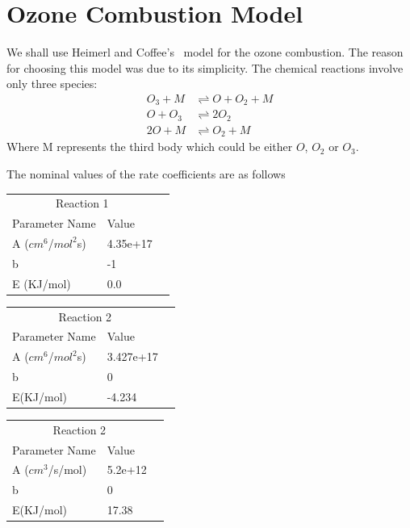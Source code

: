  \section{Ozone Combustion Model} \label{sec:ozone-data}
We shall use Heimerl and Coffee's~\cite{Heimerl} model for the ozone combustion. The reason for choosing this model was due to its
simplicity. The chemical reactions involve only three species:
%
\begin{equation}\label{eq:ozone-mech}
\begin{aligned}
  O_3 + M &\rightleftharpoons O + O_2 + M\\
  O + O_3 &\rightleftharpoons 2O_2\\
  2O + M &\rightleftharpoons O_2 + M
\end{aligned}
\end{equation}
%
Where M represents the third body which could be either $O$,
$O_2$ or $O_3$.

The nominal values of the rate coefficients are as follows

\begin{tabular}{llr}  
    \toprule
    \multicolumn{2}{c}{Reaction 1} \\
    \cmidrule(r){1-2}
    Parameter Name  & Value \\
    \midrule
    A ($cm^6$/$mol^2$s)    & 4.35e+17         \\
    b      & -1       \\
    E (KJ/mol)      & 0.0   \\
    \bottomrule
  \end{tabular}
  
\begin{tabular}{llr}  
    \toprule
    \multicolumn{2}{c}{Reaction 2} \\
    \cmidrule(r){1-2}
    Parameter Name  & Value \\
    \midrule
    A ($cm^6$/$mol^2$s)     & 3.427e+17         \\
    b      & 0       \\
    E(KJ/mol)      & -4.234   \\
    \bottomrule
  \end{tabular}
  
  
     \begin{tabular}{llr}  
    \toprule
    \multicolumn{2}{c}{Reaction 2} \\
    \cmidrule(r){1-2}
    Parameter Name  & Value \\
    \midrule
    A ($cm^3$/s/mol)     & 5.2e+12         \\
    b      & 0       \\
    E(KJ/mol)      & 17.38   \\
    \bottomrule
  \end{tabular}

